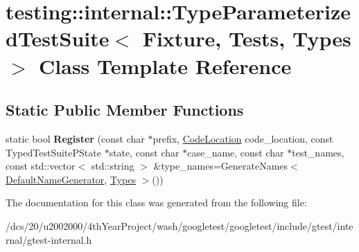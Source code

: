 \hypertarget{classtesting_1_1internal_1_1TypeParameterizedTestSuite}{}\section{testing\+:\+:internal\+:\+:Type\+Parameterized\+Test\+Suite$<$ Fixture, Tests, Types $>$ Class Template Reference}
\label{classtesting_1_1internal_1_1TypeParameterizedTestSuite}
\subsection*{Static Public Member Functions}
\begin{DoxyCompactItemize}
\item 
\mbox{\label{classtesting_1_1internal_1_1TypeParameterizedTestSuite_aefe563033024f580413cceef1f4088c7}} 
static bool {\bfseries Register} (const char $\ast$prefix, \mbox{\hyperlink{structtesting_1_1internal_1_1CodeLocation}{Code\+Location}} code\+\_\+location, const Typed\+Test\+Suite\+P\+State $\ast$state, const char $\ast$case\+\_\+name, const char $\ast$test\+\_\+names, const std\+::vector$<$ std\+::string $>$ \&type\+\_\+names=Generate\+Names$<$ \mbox{\hyperlink{structtesting_1_1internal_1_1DefaultNameGenerator}{Default\+Name\+Generator}}, \mbox{\hyperlink{structtesting_1_1internal_1_1Types}{Types}} $>$())
\end{DoxyCompactItemize}


The documentation for this class was generated from the following file\+:\begin{DoxyCompactItemize}
\item 
/dcs/20/u2002000/4th\+Year\+Project/wash/googletest/googletest/include/gtest/internal/gtest-\/internal.\+h\end{DoxyCompactItemize}
